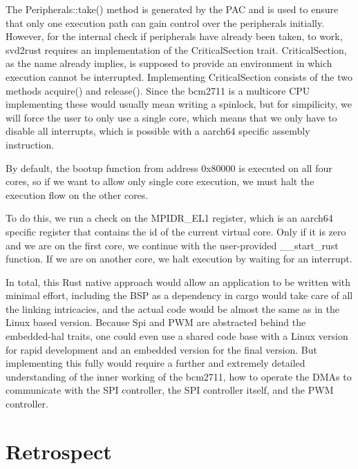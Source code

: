 The Peripherals::take() method is generated by the PAC and is used to ensure that only one execution path can gain control over the peripherals initially.
However, for the internal check if peripherals have already been taken, to work, svd2rust requires an implementation of the CriticalSection trait.
CriticalSection, as the name already implies, is supposed to provide an environment in which execution cannot be interrupted.
Implementing CriticalSection consists of the two methods acquire() and release().
Since the bcm2711 is a multicore CPU implementing these would usually mean writing a spinlock,
but for simpilicity, we will force the user to only use a single core, which means that we only have to disable all interrupts,
which is possible with a aarch64 specific assembly instruction.



By default, the bootup function from address 0x80000 is executed on all four cores,
so if we want to allow only single core execution, we must halt the execution flow on the other cores.

To do this, we run a check on the MPIDR\_EL1 register, which is an aarch64 specific register that contains the id of the current virtual core.
Only if it is zero and we are on the first core, we continue with the user-provided \_\_start\_rust function.
If we are on another core, we halt execution by waiting for an interrupt.



In total, this Rust native approach would allow an application to be written with minimal effort,
including the BSP as a dependency in cargo would take care of all the linking intricacies,
and the actual code would be almost the same as in the Linux based version.
Because Spi and PWM are abstracted behind the embedded-hal traits, one could even use a shared code base with a Linux version for rapid development
and an embedded version for the final version.
But implementing this fully would require a further and extremely detailed understanding of the inner working of the bcm2711,
how to operate the DMAs to communicate with the SPI controller, the SPI controller itself, and the PWM controller.

\section{Retrospect}

